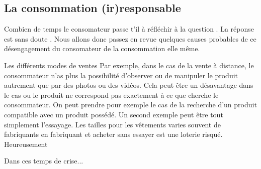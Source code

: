 \subsection{La consommation (ir)responsable}

Combien de temps le consomateur passe t'il à réfléchir à la question .
La réponse est sans doute . Nous allons donc passez en revue quelques causes probables de ce désengagement du consomateur de la consommation elle même.

\medbreak
Les différents modes de ventes 
Par exemple, dans le cas de la vente à distance, le consommateur n'as plus la possibilité d'observer ou de manipuler le produit autrement que par des photos ou des vidéos.
Cela peut être un désavantage dans le cas ou le produit ne correspond pas exactement à ce que cherche le consommateur.
\smallbreak
On peut prendre pour exemple le cas de la recherche d'un produit compatible avec un produit possédé.
Un second exemple peut être tout simplement l'essayage. Les tailles pour les vêtements varies souvent de fabriquants en fabriquant et acheter sans essayer est une loterie risqué.
\smallbreak
 Heureusement %

\medbreak
Dans ces temps de crise... %


